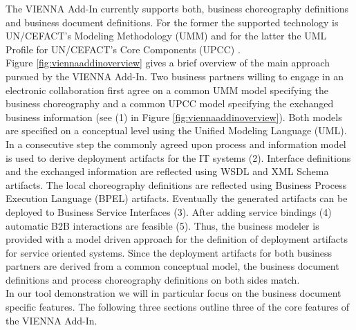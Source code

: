 \documentclass{acm_proc_article-sp}
\begin{document}
The VIENNA Add-In currently supports both, business choreography definitions and business document definitions. For the former the supported technology is UN/CEFACT's Modeling Methodology (UMM) \cite{man:umm2} and for the latter the UML Profile for UN/CEFACT's Core Components (UPCC) \cite{man:upcc}. \\Figure \ref{fig:viennaaddinoverview} gives a brief overview of the main approach pursued by the VIENNA Add-In. Two business partners willing to engage in an electronic collaboration first agree on a common UMM model specifying the business choreography and a common UPCC model specifying the exchanged business information (see (1) in Figure \ref{fig:viennaaddinoverview}). Both models are specified on a conceptual level using the Unified Modeling Language (UML). In a consecutive step the commonly agreed upon process and information model is used to derive deployment artifacts for the IT systems (2). Interface definitions and the exchanged information are reflected using WSDL and XML Schema artifacts. The local choreography definitions are reflected using Business Process Execution Language (BPEL) artifacts. Eventually the generated artifacts can be deployed to Business Service Interfaces (3). After adding service bindings (4) automatic B2B interactions are feasible (5). Thus, the business modeler is provided with a model driven approach for the definition of deployment artifacts for service oriented systems. Since the deployment artifacts for both business partners are derived from a common conceptual model, the business document definitions and process choreography definitions on both sides match. \\In our tool demonstration we will in particular focus on the business document specific features. The following three sections outline three of the core features of the VIENNA Add-In.

\end{document}
